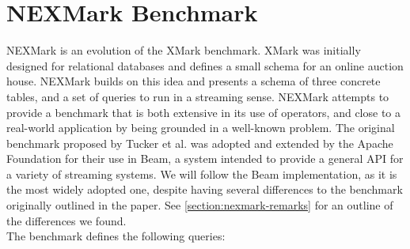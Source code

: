 \section{NEXMark Benchmark\cite{nexmark}}
NEXMark is an evolution of the XMark benchmark. XMark was initially designed for relational databases and defines a small schema for an online auction house. NEXMark builds on this idea and presents a schema of three concrete tables, and a set of queries to run in a streaming sense. NEXMark attempts to provide a benchmark that is both extensive in its use of operators, and close to a real-world application by being grounded in a well-known problem. The original benchmark proposed by Tucker et al. was adopted and extended by the Apache Foundation for their use in Beam\cite{nexmark-beam}, a system intended to provide a general API for a variety of streaming systems. We will follow the Beam implementation, as it is the most widely adopted one, despite having several differences to the benchmark originally outlined in the paper. See \autoref{section:nexmark-remarks} for an outline of the differences we found. \\

The benchmark defines the following queries:

